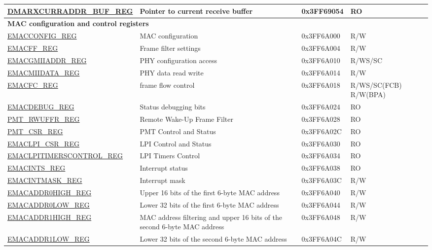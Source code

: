 \begin{longtable}{ |m{5cm} |m{6cm} | m{2cm} |m{2.2cm} | }
\hyperref[regdesc:DMARXCURRADDRBUFREG]{DMARXCURRADDR\_BUF\_REG} & Pointer to current receive buffer & 0x3FF69054 & RO \\ \hline
\multicolumn{4}{|l|}{\textbf{MAC configuration and control registers}} \\ \hline
\hyperref[regdesc:EMACCONFIGREG]{EMACCONFIG\_REG} & MAC configuration & 0x3FF6A000 & R/W \\ \hline
\hyperref[regdesc:EMACFFREG]{EMACFF\_REG} & Frame filter settings & 0x3FF6A004 & R/W \\ \hline
\hyperref[regdesc:EMACMIIADDRREG]{EMACGMIIADDR\_REG} & PHY configuration access & 0x3FF6A010 & R/WS/SC \\ \hline
\hyperref[regdesc:EMACMIIDATAREG]{EMACMIIDATA\_REG} & PHY data read write & 0x3FF6A014 & R/W \\ \hline
\hyperref[regdesc:EMACFCREG]{EMACFC\_REG} & frame flow control& 0x3FF6A018 & R/WS/SC(FCB) R/W(BPA) \\ \hline
\hyperref[regdesc:EMACDEBUGREG]{EMACDEBUG\_REG} & Status debugging bits & 0x3FF6A024 & RO \\ \hline
\hyperref[regdesc:PMT_RWUFFRREG]{PMT\_RWUFFR\_REG} & Remote Wake-Up Frame Filter & 0x3FF6A028 & RO \\ \hline
\hyperref[regdesc:PMT_CSRREG]{PMT\_CSR\_REG} & PMT Control and Status & 0x3FF6A02C & RO \\ \hline
\hyperref[regdesc:EMACLPI_CSRREG]{EMACLPI\_CSR\_REG} & LPI Control and Status & 0x3FF6A030 & RO \\ \hline
\hyperref[regdesc:EMACLPITIMERSCONTROLREG]{EMACLPITIMERSCONTROL\_REG} & LPI Timers Control & 0x3FF6A034 & RO \\ \hline
\hyperref[regdesc:EMACINTSREG]{EMACINTS\_REG} & Interrupt status & 0x3FF6A038 & RO \\ \hline
\hyperref[regdesc:EMACINTMASKREG]{EMACINTMASK\_REG} & Interrupt mask & 0x3FF6A03C & R/W \\ \hline
\hyperref[regdesc:EMACADDR0HIGHREG]{EMACADDR0HIGH\_REG} & Upper 16 bits of the first 6-byte MAC address & 0x3FF6A040 & R/W \\ \hline
\hyperref[regdesc:EMACADDR0LOWREG]{EMACADDR0LOW\_REG} & Lower 32 bits of the first 6-byte MAC address & 0x3FF6A044 & R/W \\ \hline
\hyperref[regdesc:EMACADDR1HIGHREG]{EMACADDR1HIGH\_REG} & MAC address filtering and upper 16 bits of the second 6-byte MAC address & 0x3FF6A048 & R/W \\ \hline
\hyperref[regdesc:EMACADDR1LOWREG]{EMACADDR1LOW\_REG} & Lower 32 bits of the second 6-byte MAC address & 0x3FF6A04C & R/W \\ \hline

\end{longtable}

